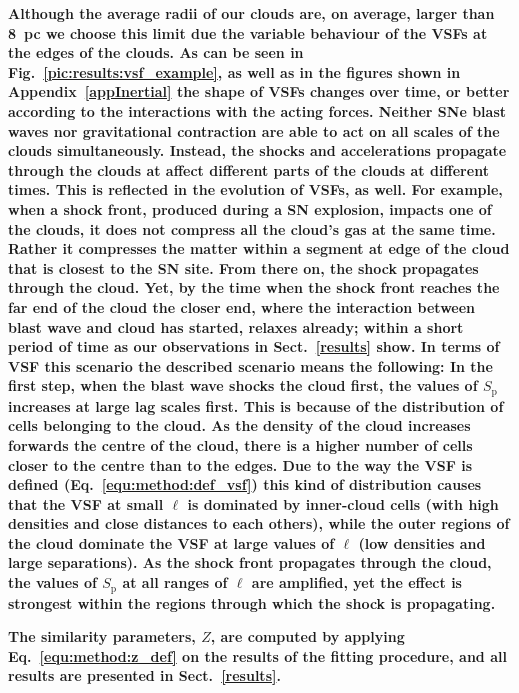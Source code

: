 \textbf{
    Although the average radii of our clouds are, on average, larger than 8~pc we choose this limit due the variable behaviour of the VSFs at the edges of the clouds. 
    As can be seen in Fig.~\ref{pic:results:vsf_example}, as well as in the figures shown in Appendix~\ref{appInertial} the shape of VSFs changes over time, or better according to the interactions with the acting forces.
    Neither SNe blast waves nor gravitational contraction are able to act on all scales of the clouds simultaneously. 
    Instead, the shocks and accelerations propagate through the clouds at affect different parts of the clouds at different times.
    This is reflected in the evolution of VSFs, as well.
    For example, when a shock front, produced during a SN explosion, impacts one of the clouds, it does not compress all the cloud's gas at the same time.
    Rather it compresses the matter within a segment at edge of the cloud that is closest to the SN site.
    From there on, the shock propagates through the cloud.
    Yet, by the time when the shock front reaches the far end of the cloud the closer end, where the interaction between blast wave and cloud has started, relaxes already; within a short period of time as our observations in Sect.~\ref{results} show.
    In terms of VSF this scenario the described scenario means the following:
    In the first step, when the blast wave shocks the cloud first, the values of $S_\mathrm{p}$ increases at large lag scales first.
    This is because of the distribution of cells belonging to the cloud. 
    As the density of the cloud increases forwards the centre of the cloud, there is a higher number of cells closer to the centre than to the edges. 
    Due to the way the VSF is defined (Eq.~\ref{equ:method:def_vsf}) this kind of distribution causes that the VSF at small $\ell$ is dominated by inner-cloud cells (with high densities and close distances to each others), while the outer regions of the cloud dominate the VSF at large values of $\ell$ (low densities and large separations).
    As the shock front propagates through the cloud, the values of $S_\mathrm{p}$ at all ranges of $\ell$ are amplified, yet the effect is strongest within the regions through which the shock is propagating.
}

\textbf{
    The similarity parameters, $Z$, are computed by applying Eq.~\ref{equ:method:z_def} on the results of the fitting procedure, and all results are presented in Sect.~\ref{results}.
}

